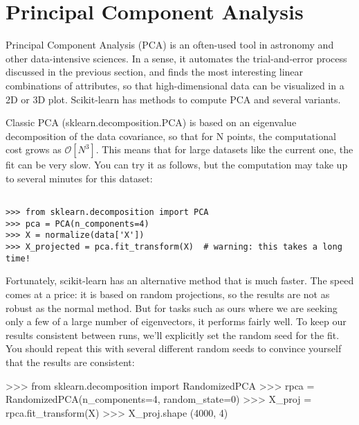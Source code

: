 \section*{Principal Component Analysis}

Principal Component Analysis (PCA) is an often-used tool in astronomy and other data-intensive sciences. In a sense, it automates the trial-and-error process discussed in the previous section, and finds the most interesting linear combinations of attributes, so that high-dimensional data can be visualized in a 2D or 3D plot. Scikit-learn has methods to compute PCA and several variants. 

Classic PCA (sklearn.decomposition.PCA) is based on an eigenvalue decomposition of the data covariance, so that for N points, the computational cost grows as $\mathcal{O}[N^3]$. This means that for large datasets like the current one, the fit can be very slow. You can try it as follows, but the computation may take up to several minutes for this dataset:

\begin{framed}
\begin{verbatim}

>>> from sklearn.decomposition import PCA
>>> pca = PCA(n_components=4)
>>> X = normalize(data['X'])
>>> X_projected = pca.fit_transform(X)  # warning: this takes a long time!
\end{verbatim}
\end{framed}


Fortunately, scikit-learn has an alternative method that is much faster. The speed comes at a price: it is based on random projections, so the results are not as robust as the normal method. But for tasks such as ours where we are seeking only a few of a large number of eigenvectors, it performs fairly well. To keep our results consistent between runs, we’ll explicitly set the random seed for the fit. You should repeat this with several different random seeds to convince yourself that the results are consistent:

>>> from sklearn.decomposition import RandomizedPCA
>>> rpca = RandomizedPCA(n_components=4, random_state=0)
>>> X_proj = rpca.fit_transform(X)
>>> X_proj.shape
(4000, 4)


